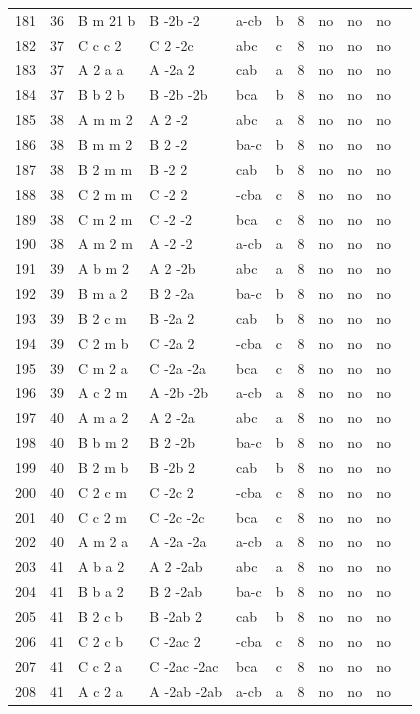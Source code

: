 \begin{center}
\begin{small}
\begin{longtable}{|l|l|l|l|l|l|l|l|l|l|l|}
181 &36 &B m 21 b &B -2b -2 &a-cb &b &8 &no &no &no \\ 
182 &37 &C c c 2 &C 2 -2c &abc &c &8 &no &no &no \\ 
183 &37 &A 2 a a &A -2a 2 &cab &a &8 &no &no &no \\ 
184 &37 &B b 2 b &B -2b -2b &bca &b &8 &no &no &no \\ 
185 &38 &A m m 2 &A 2 -2 &abc &a &8 &no &no &no \\ 
186 &38 &B m m 2 &B 2 -2 &ba-c &b &8 &no &no &no \\ 
187 &38 &B 2 m m &B -2 2 &cab &b &8 &no &no &no \\ 
188 &38 &C 2 m m &C -2 2 &-cba &c &8 &no &no &no \\ 
189 &38 &C m 2 m &C -2 -2 &bca &c &8 &no &no &no \\ 
190 &38 &A m 2 m &A -2 -2 &a-cb &a &8 &no &no &no \\ 
191 &39 &A b m 2 &A 2 -2b &abc &a &8 &no &no &no \\ 
192 &39 &B m a 2 &B 2 -2a &ba-c &b &8 &no &no &no \\ 
193 &39 &B 2 c m &B -2a 2 &cab &b &8 &no &no &no \\ 
194 &39 &C 2 m b &C -2a 2 &-cba &c &8 &no &no &no \\ 
195 &39 &C m 2 a &C -2a -2a &bca &c &8 &no &no &no \\ 
196 &39 &A c 2 m &A -2b -2b &a-cb &a &8 &no &no &no \\ 
197 &40 &A m a 2 &A 2 -2a &abc &a &8 &no &no &no \\ 
198 &40 &B b m 2 &B 2 -2b &ba-c &b &8 &no &no &no \\ 
199 &40 &B 2 m b &B -2b 2 &cab &b &8 &no &no &no \\ 
200 &40 &C 2 c m &C -2c 2 &-cba &c &8 &no &no &no \\ 
201 &40 &C c 2 m &C -2c -2c &bca &c &8 &no &no &no \\ 
202 &40 &A m 2 a &A -2a -2a &a-cb &a &8 &no &no &no \\ 
203 &41 &A b a 2 &A 2 -2ab &abc &a &8 &no &no &no \\ 
204 &41 &B b a 2 &B 2 -2ab &ba-c &b &8 &no &no &no \\ 
205 &41 &B 2 c b &B -2ab 2 &cab &b &8 &no &no &no \\ 
206 &41 &C 2 c b &C -2ac 2 &-cba &c &8 &no &no &no \\ 
207 &41 &C c 2 a &C -2ac -2ac &bca &c &8 &no &no &no \\ 
208 &41 &A c 2 a &A -2ab -2ab &a-cb &a &8 &no &no &no \\ 

\end{longtable}
\end{small}
\end{center}
